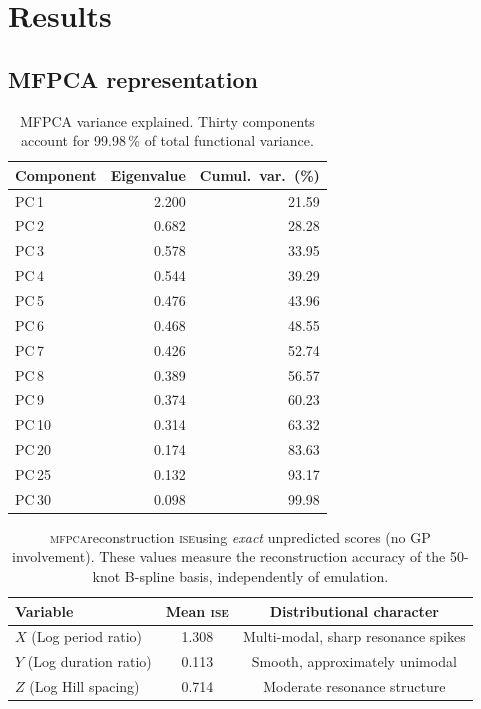 \documentclass[12pt,a4paper]{article}
\newcommand{\MFPCA}{\textsc{mfpca}}
\newcommand{\ISE}{\textsc{ise}}
\begin{document}
\section{Results}
\label{sec:results}

\subsection{MFPCA representation}
\label{sec:mfpca_quality}

\begin{table}[htbp]
  \centering
  \caption{MFPCA variance explained.  Thirty components account
           for 99.98\,\% of total functional variance.}
  \label{tab:mfpca_var}
  \begin{tabular}{lrr}
    \toprule
    Component & Eigenvalue & Cumul.\ var.\ (\%) \\
    \midrule
    PC\,1  & 2.200 & 21.59 \\
    PC\,2  & 0.682 & 28.28 \\
    PC\,3  & 0.578 & 33.95 \\
    PC\,4  & 0.544 & 39.29 \\
    PC\,5  & 0.476 & 43.96 \\
    PC\,6  & 0.468 & 48.55 \\
    PC\,7  & 0.426 & 52.74 \\
    PC\,8  & 0.389 & 56.57 \\
    PC\,9  & 0.374 & 60.23 \\
    PC\,10 & 0.314 & 63.32 \\
    \midrule
    PC\,20 & 0.174 & 83.63 \\
    PC\,25 & 0.132 & 93.17 \\
    PC\,30 & 0.098 & 99.98 \\
    \bottomrule
  \end{tabular}
\end{table}

\begin{table}[htbp]
  \centering
  \caption{\MFPCA reconstruction \ISE using \emph{exact} unpredicted
           scores (no GP involvement).  These values measure the
           reconstruction accuracy of the 50-knot B-spline basis,
           independently of emulation.}
  \label{tab:mfpca_recon}
  \begin{tabular}{lcc}
    \toprule
    Variable & Mean \ISE & Distributional character \\
    \midrule
    $X$ (Log period ratio)   & 1.308 & Multi-modal, sharp resonance spikes \\
    $Y$ (Log duration ratio) & 0.113 & Smooth, approximately unimodal \\
    $Z$ (Log Hill spacing)   & 0.714 & Moderate resonance structure \\
    \bottomrule
  \end{tabular}
\end{table}
\end{document}
